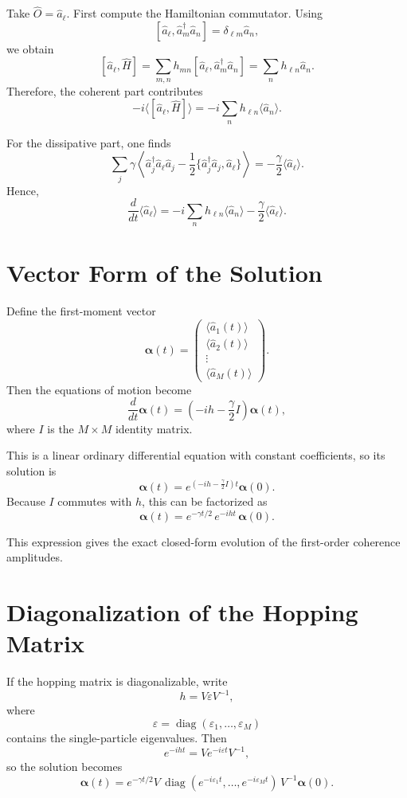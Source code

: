 \documentclass[12pt]{article}
\begin{document}
Take $\hat O=\hat a_\ell$. First compute the Hamiltonian commutator. Using
\[
[\hat a_\ell,\hat a_m^\dagger \hat a_n] = \delta_{\ell m}\hat a_n,
\]
we obtain
\[
[\hat a_\ell,\hat H]
=
\sum_{m,n} h_{mn}[\hat a_\ell,\hat a_m^\dagger \hat a_n]
=
\sum_n h_{\ell n}\hat a_n.
\]
Therefore, the coherent part contributes
\[
-i\langle[\hat a_\ell,\hat H]\rangle
=
-i\sum_n h_{\ell n}\langle \hat a_n\rangle.
\]

For the dissipative part, one finds
\[
\sum_j \gamma
\left\langle
\hat a_j^\dagger \hat a_\ell \hat a_j
-\frac12\{\hat a_j^\dagger \hat a_j,\hat a_\ell\}
\right\rangle
=
-\frac{\gamma}{2}\langle \hat a_\ell\rangle.
\]
Hence,
\[
\boxed{
\frac{d}{dt}\langle \hat a_\ell\rangle
=
-i\sum_n h_{\ell n}\langle \hat a_n\rangle
-\frac{\gamma}{2}\langle \hat a_\ell\rangle.
}
\]

\section*{Vector Form of the Solution}
Define the first-moment vector
\[
\bm{\alpha}(t)
=
\begin{pmatrix}
\langle \hat a_1(t)\rangle\\
\langle \hat a_2(t)\rangle\\
\vdots\\
\langle \hat a_M(t)\rangle
\end{pmatrix}.
\]
Then the equations of motion become
\[
\frac{d}{dt}\bm{\alpha}(t)
=
\left(-ih-\frac{\gamma}{2}I\right)\bm{\alpha}(t),
\]
where $I$ is the $M\times M$ identity matrix.

This is a linear ordinary differential equation with constant coefficients, so its solution is
\[
\boxed{
\bm{\alpha}(t)
=
e^{\left(-ih-\frac{\gamma}{2}I\right)t}
\bm{\alpha}(0).
}
\]
Because $I$ commutes with $h$, this can be factorized as
\[
\boxed{
\bm{\alpha}(t)
=
e^{-\gamma t/2}\,e^{-iht}\,\bm{\alpha}(0).
}
\]

This expression gives the exact closed-form evolution of the first-order coherence amplitudes.

\section*{Diagonalization of the Hopping Matrix}
If the hopping matrix is diagonalizable, write
\[
h = V \varepsilon V^{-1},
\]
where
\[
\varepsilon = \operatorname{diag}(\varepsilon_1,\dots,\varepsilon_M)
\]
contains the single-particle eigenvalues. Then
\[
e^{-iht} = V e^{-i\varepsilon t} V^{-1},
\]
so the solution becomes
\[
\boxed{
\bm{\alpha}(t)
=
e^{-\gamma t/2}
V\,\operatorname{diag}(e^{-i\varepsilon_1 t},\dots,e^{-i\varepsilon_M t})\,V^{-1}\bm{\alpha}(0).
}
\]
\end{document}
